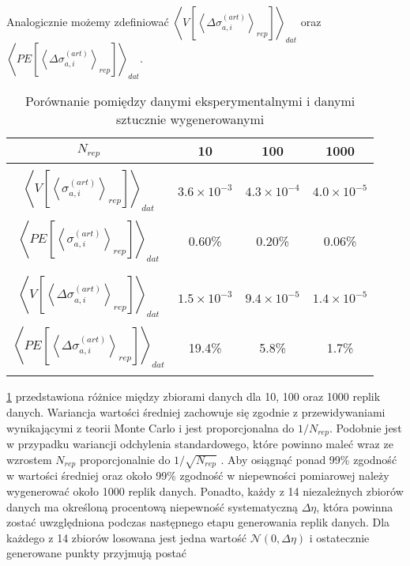 \documentclass[11pt]{book}
\theoremstyle{definition}
\begin{document}
Analogicznie możemy zdefiniować $\left \langle V	\left[ \left \langle \Delta \sigma_{a,i}^{(art)} \right \rangle_{rep} \right] \right \rangle_{dat}$ oraz $\left \langle PE	\left[ \left \langle \Delta \sigma_{a,i}^{(art)} \right \rangle_{rep} \right] \right \rangle_{dat}$.


\begin{table}
	\centering
	\caption{Porównanie pomiędzy danymi eksperymentalnymi i danymi sztucznie wygenerowanymi}\label{tab:nrep} 
	
	\begin{tabular}{c|c c c}
		\hline 
		$N_{rep}$ & 10 & 100 & 1000 \\\hline
		\\
		$ \left \langle V	\left[ \left \langle \sigma_{a,i}^{(art)} \right \rangle_{rep} \right] \right \rangle_{dat} $ & $3.6 \times 10^{-3}$ & $4.3 \times 10^{-4}$ & $4.0 \times 10^{-5}$  \\ \\
		$ \left \langle PE	\left[ \left \langle \sigma_{a,i}^{(art)} \right \rangle_{rep} \right] \right \rangle_{dat} $ & 0.60\% & 0.20\% & 0.06\%  \\ 
		\\ \hline \\
		$ \left \langle V	\left[ \left \langle \Delta \sigma_{a,i}^{(art)} \right \rangle_{rep} \right] \right \rangle_{dat} $ & $1.5 \times 10^{-3}$ & $9.4 \times 10^{-5}$ & $1.4 \times 10^{-5}$   \\ \\
		$ \left \langle PE	\left[ \left \langle \Delta \sigma_{a,i}^{(art)} \right \rangle_{rep} \right] \right \rangle_{dat} $ & 19.4\% & 5.8\% & 1.7\%  \\ \\ \hline


	\end{tabular}
\end{table}

\tablename{} \ref{tab:nrep} przedstawiona różnice między zbiorami danych dla 10, 100 oraz 1000 replik danych. Wariancja wartości średniej zachowuje się zgodnie z przewidywaniami wynikającymi z teorii Monte Carlo i jest proporcjonalna do $1/N_{rep}$. Podobnie jest w przypadku wariancji odchylenia standardowego, które powinno maleć wraz ze wzrostem $N_{rep}$ proporcjonalnie do $1/\sqrt{N_{rep}}$ \cite{2002JHEP...05..062F}. Aby osiągnąć ponad 99\% zgodność w wartości średniej oraz około 99\% zgodność w niepewności pomiarowej należy wygenerować około 1000 replik danych.
%
Ponadto, każdy z 14 niezależnych zbiorów danych ma określoną procentową niepewność systematyczną $\Delta\eta$, która powinna zostać uwzględniona podczas następnego etapu generowania replik danych. Dla każdego z 14 zbiorów losowana jest jedna wartość $\mathcal{N}\left( 0, \Delta \eta \right)$ i ostatecznie generowane punkty przyjmują postać
\end{document}
